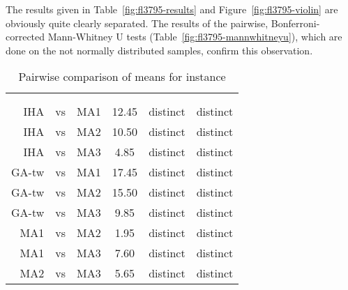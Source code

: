 \documentclass[thesis.tex]{subfiles}
\begin{document}
\subsubsection{}
   \renewcommand{\CurrentInstance}{\Instance{fl3795}}
   \renewcommand{\CurrentInstanceFileEscaped}{fl3795}
   \renewcommand{\CurrentInstanceTexEscaped}{fl3795}



The results given in Table~\vref{fig:fl3795-results} and Figure~\vref{fig:fl3795-violin} are obviously quite clearly separated. The results of the pairwise, Bonferroni-corrected Mann-Whitney U tests (Table~\vref{fig:fl3795-mannwhitneyu}), which are done on the not normally distributed samples, confirm this observation.
\begin{table}[htbp]
   \caption{Pairwise comparison of means for instance \CurrentInstance}
   \label{fig:\CurrentInstanceFileEscaped-mannwhitneyu}
   \centering\small
      \begin{tabular}{r@{\ }c@{\ }l S[table-format=2.2] c c} \toprule
         &&&                          &  \\ \cmidrule(lr){5-6}
         &&&  &  &  \\ \midrule

         \gls{IHA} &vs& \gls{MA1}   & 12.45 & distinct & distinct \\
         \gls{IHA} &vs& \gls{MA2}   & 10.50 & distinct & distinct \\
         \gls{IHA} &vs& \gls{MA3}   &  4.85 & distinct & distinct \\
         \gls{GA-tw} &vs& \gls{MA1} & 17.45 & distinct & distinct \\
         \gls{GA-tw} &vs& \gls{MA2} & 15.50 & distinct & distinct \\
         \gls{GA-tw} &vs& \gls{MA3} &  9.85 & distinct & distinct \\
         \gls{MA1} &vs& \gls{MA2}   &  1.95 & distinct & distinct \\
         \gls{MA1} &vs& \gls{MA3}   &  7.60 & distinct & distinct \\
         \gls{MA2} &vs& \gls{MA3}   &  5.65 & distinct & distinct \\
         \bottomrule
      \end{tabular}
\end{table}
\clearpage
\end{document}
